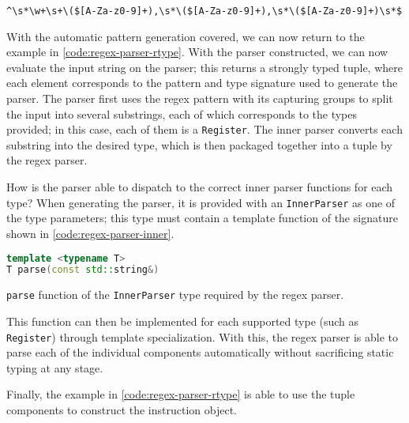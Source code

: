 \texttt{\^{}\textbackslash s*\textbackslash w+\textbackslash s+\textbackslash (\$[A-Za-z0-9]+),\textbackslash s*\textbackslash (\$[A-Za-z0-9]+),\textbackslash s*\textbackslash (\$[A-Za-z0-9]+)\textbackslash s*\$}

With the automatic pattern generation covered, we can now return to the example in \autoref{code:regex-parser-rtype}. With the parser constructed, we can now evaluate the input string on the parser; this returns a strongly typed tuple, where each element corresponds to the pattern and type signature used to generate the parser. The parser first uses the regex pattern with its capturing groups to split the input into several substrings, each of which corresponds to the types provided; in this case, each of them is a \texttt{Register}. The inner parser converts each substring into the desired type, which is then packaged together into a tuple by the regex parser.

How is the parser able to dispatch to the correct inner parser functions for each type? When generating the parser, it is provided with an \texttt{InnerParser} as one of the type parameters; this type must contain a template function of the signature shown in \autoref{code:regex-parser-inner}.

\begin{lstfloat}[H]
    \begin{lstlisting}[language=c++]
template <typename T>
T parse(const std::string&)
    \end{lstlisting}
    \caption{\texttt{parse} function of the \texttt{InnerParser} type required by the regex parser.}
    \label{code:regex-parser-inner}
\end{lstfloat}

This function can then be implemented for each supported type (such as \texttt{Register}) through template specialization. With this, the regex parser is able to parse each of the individual components automatically without sacrificing static typing at any stage.

Finally, the example in \autoref{code:regex-parser-rtype} is able to use the tuple components to construct the instruction object.